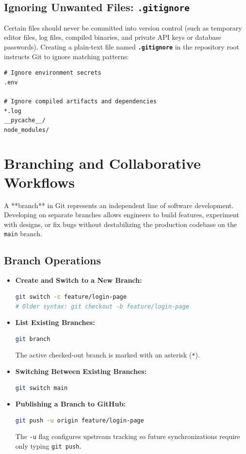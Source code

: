 \subsection{Ignoring Unwanted Files: \texttt{.gitignore}}
Certain files should never be committed into version control (such as temporary editor files, log files, compiled binaries, and private API keys or database passwords). Creating a plain-text file named \textbf{\texttt{.gitignore}} in the repository root instructs Git to ignore matching patterns:
\begin{lstlisting}
# Ignore environment secrets
.env

# Ignore compiled artifacts and dependencies
*.log
__pycache__/
node_modules/
\end{lstlisting}

\section{Branching and Collaborative Workflows}

A **branch** in Git represents an independent line of software development. Developing on separate branches allows engineers to build features, experiment with designs, or fix bugs without destabilizing the production codebase on the \texttt{main} branch.

\subsection{Branch Operations}
\begin{itemize}[leftmargin=1.2em]
    \item \textbf{Create and Switch to a New Branch:}
    \begin{lstlisting}[language=bash]
git switch -c feature/login-page
# Older syntax: git checkout -b feature/login-page
    \end{lstlisting}
    \item \textbf{List Existing Branches:}
    \begin{lstlisting}[language=bash]
git branch
    \end{lstlisting}
    The active checked-out branch is marked with an asterisk (\texttt{*}).
    \item \textbf{Switching Between Existing Branches:}
    \begin{lstlisting}[language=bash]
git switch main
    \end{lstlisting}
    \item \textbf{Publishing a Branch to GitHub:}
    \begin{lstlisting}[language=bash]
git push -u origin feature/login-page
    \end{lstlisting}
    The \texttt{-u} flag configures upstream tracking so future synchronizations require only typing \texttt{git push}.
\end{itemize}

